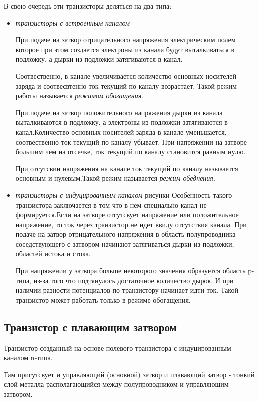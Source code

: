 \documentclass[../main.tex]{subfiles}
\begin{document}
В свою очередь эти транзисторы деляться на два типа:
\begin{itemize}
    \item \textit{транзисторы с встроенным каналом}

    При подаче на затвор отрицательного напряжения электрическим полем которое при этом создается электроны из канала будут выталкиваться в подложку, а дырки из подложки затягиваются в канал.
    
    Соотвественно, в канале увеличивается количество основных носителей заряда и соотвесвтенно ток текущий по каналу возрастает. Такой режим работы называется \textit{режимом обогащения}.
    
    При подаче на затвор положительного напряжения дырки из канала выталкиваются в подложку, а электроны из подложки затягиваются в канал.Количество основных носителей заряда в канале
    уменьшается, соотвественно ток текущий по каналу убывает. При напряжении на затворе большим чем на отсечке, ток текущий по каналу становится равным нулю.
    
    При отсутсвии напряжения на канале ток текущий по каналу называется основным и нулевым.Такой режим называется \textit{режим обеднения.}

    \item \textit{транзисторы с индуцированным каналом}
    рисунки
    Особенность такого транзистора заключается в том что в нем специально канал не формируется.Если на затворе отсутсвует напряжение или положительное напряжение, то ток через
    транзистор не идет ввиду отсутствия канала. При подаче на затвор отрицательного напряжения в область полупроводника соседствующего с затвором начинают затягиваться дырки из подложки, областей истока и  стока.

    При напряжении у затвора больше некоторого значения образуется область p-типа, из-за того что подтянулось достаточное количество дырок. И при наличии разности потенциалов по транзистору начинает идти ток.
    Такой транзистор может работать только в режиме обогащения.
\end{itemize}

\subsection{Транзистор с плавающим затвором}
 Транзистор созданный на основе полевого транзистора с индуцированным каналом n-типа.

 Там присутсвует и управляющий (основной) затвор и плавающий затвор - тонкий слой металла располагающийся между полупроводником и управляющим затвором.
\end{document}
